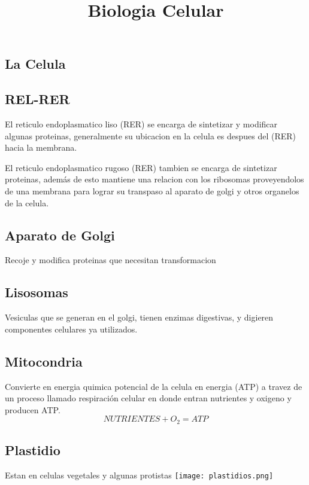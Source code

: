\documentclass{article}
\begin{document}
\title{Biologia Celular}
\maketitle

\begin{Large}
\section*{La Celula}
\end{Large}

\subsection*{REL-RER}
       El reticulo endoplasmatico liso (RER) se encarga de sintetizar y modificar algunas proteinas, generalmente su ubicacion en la celula es despues del (RER) hacia la membrana.

El reticulo endoplasmatico rugoso (RER) tambien se encarga de sintetizar proteinas, además de esto mantiene una relacion con los ribosomas proveyendolos de una membrana para lograr su transpaso al aparato de golgi y otros organelos de la celula.

\subsection*{Aparato de Golgi}
Recoje y modifica proteinas que necesitan transformacion

\subsection*{Lisosomas}
Vesiculas que se generan en el golgi, tienen enzimas digestivas, y digieren componentes celulares ya utilizados.

\subsection*{Mitocondria}

Convierte en energia quimica potencial de la celula en energia (ATP) a travez de un proceso llamado respiración celular en donde entran nutrientes y oxigeno y producen ATP.
\begin{equation}
NUTRIENTES + O_2 = ATP
\end{equation}

\subsection*{Plastidio}              
Estan en celulas vegetales y algunas protistas                                 
\texttt{[image: plastidios.png]}
\end{document}
